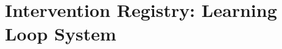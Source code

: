 
\chapter{Intervention Registry: Learning Loop System}
\label{app:intervention-registry}

\begin{abstract}
This appendix presents the key concepts and formalizations for Intervention Registry: Learning Loop System.
It provides theoretical foundations, practical applications, and integration
points with other components of the Evidence-Based Framework (EBF).
The content supports decision-making and behavioral analysis in the context
of complementarity and context-dependent outcomes.
\end{abstract}


